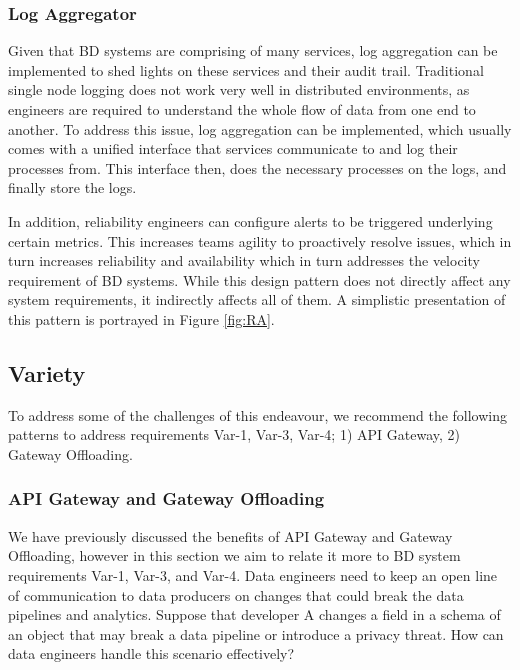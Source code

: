\documentclass[a4paper,11pt,article,oneside]{memoir}
\begin{document}
\subsubsection{Log Aggregator}

Given that BD systems are comprising of many services, log aggregation can be implemented to shed lights on these services and their audit trail. Traditional single node logging does not work very well in distributed environments, as engineers are required to understand the whole flow of data from one end to another. To address this issue, log aggregation can be implemented, which usually comes with a unified interface that services communicate to and log their processes from. This interface then, does the necessary processes on the logs, and finally store the logs. 

In addition, reliability engineers can configure alerts to be triggered underlying certain metrics. This increases teams agility to proactively resolve issues, which in turn increases reliability and availability which in turn addresses the velocity requirement of BD systems. While this design pattern does not directly affect any system requirements, it indirectly affects all of them. A simplistic presentation of this pattern is portrayed in Figure \ref{fig:RA}. 




\subsection{Variety}
To address some of the challenges of this endeavour, we recommend the following patterns to address requirements Var-1, Var-3, Var-4; 1) API Gateway, 2) Gateway Offloading.

\subsubsection{API Gateway and Gateway Offloading}

We have previously discussed the benefits of API Gateway and Gateway Offloading, however in this section we aim to relate it more to BD system requirements Var-1, Var-3, and Var-4. Data engineers need to keep an open line of communication to data producers on changes that could break the data pipelines and analytics. Suppose that developer A changes a field in a schema of an object that may break a data pipeline or introduce a privacy threat. How can data engineers handle this scenario effectively? 
\end{document}
